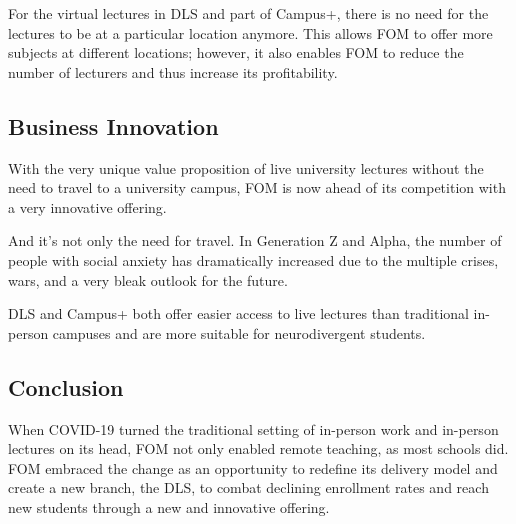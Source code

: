 For the virtual lectures in DLS and part of Campus+, there is no need for the lectures to be at a particular location anymore. This allows FOM to offer more subjects at different locations; however, it also enables FOM to reduce the number of lecturers and thus increase its profitability.

\subsection{Business Innovation}

With the very unique value proposition of live university lectures without the need to travel to a university campus, FOM is now ahead of its competition with a very innovative offering.

And it's not only the need for travel. In Generation Z and Alpha, the number of people with social anxiety has dramatically increased due to the multiple crises, wars, and a very bleak outlook for the future.

DLS and Campus+ both offer easier access to live lectures than traditional in-person campuses and are more suitable for neurodivergent students.

\subsection{Conclusion}

When COVID-19 turned the traditional setting of in-person work and in-person lectures on its head, FOM not only enabled remote teaching, as most schools did. FOM embraced the change as an opportunity to redefine its delivery model and create a new branch, the DLS, to combat declining enrollment rates and reach new students through a new and innovative offering.
